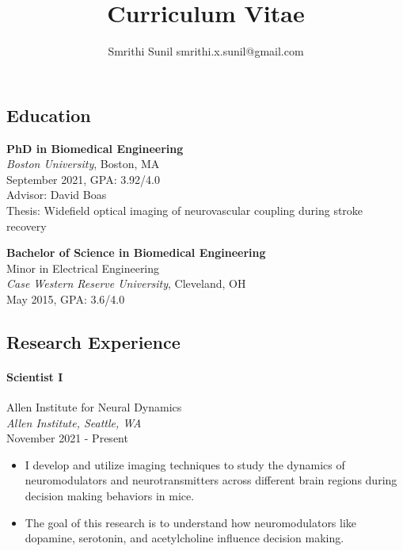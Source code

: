 \documentclass[
  letterpaper,
  DIV=11,
  numbers=noendperiod]{scrartcl}
\title{Curriculum Vitae}
\subtitle{Smrithi Sunil \textbar{} smrithi.x.sunil@gmail.com}
\author{}
\date{}
\let\oldparagraph\paragraph
\renewcommand{\paragraph}[1]{\oldparagraph{#1}\mbox{}}
\providecommand{\tightlist}{%
  \setlength{\itemsep}{0pt}\setlength{\parskip}{0pt}}\usepackage{longtable,booktabs,array}
\begin{document}
\maketitle
\ifdefined\Shaded\renewenvironment{Shaded}{\begin{tcolorbox}[frame hidden, sharp corners, borderline west={3pt}{0pt}{shadecolor}, breakable, enhanced, interior hidden, boxrule=0pt]}{\end{tcolorbox}}\fi

\hypertarget{education}{%
\subsection{Education}\label{education}}

\textbf{PhD in Biomedical Engineering}\\
\emph{Boston University}, Boston, MA\\
September 2021, GPA: 3.92/4.0\\
Advisor: David Boas\\
Thesis: Widefield optical imaging of neurovascular coupling during
stroke recovery

\textbf{Bachelor of Science in Biomedical Engineering}\\
Minor in Electrical Engineering\\
\emph{Case Western Reserve University}, Cleveland, OH\\
May 2015, GPA: 3.6/4.0

\hypertarget{research-experience}{%
\subsection{Research Experience}\label{research-experience}}

\hypertarget{scientist-i}{%
\paragraph{Scientist I}\label{scientist-i}}

Allen Institute for Neural Dynamics\\
\emph{Allen Institute, Seattle, WA}\\
November 2021 - Present

\begin{itemize}
\tightlist
\item
  I develop and utilize imaging techniques to study the dynamics of
  neuromodulators and neurotransmitters across different brain regions
  during decision making behaviors in mice.
\item
  The goal of this research is to understand how neuromodulators like
  dopamine, serotonin, and acetylcholine influence decision making.
\end{itemize}
\end{document}

